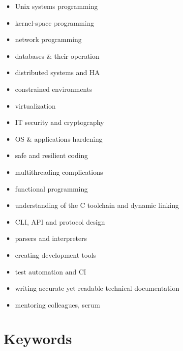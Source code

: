\documentclass[a4paper,12pt]{article}
\newcommand{\compress}{\setlength\itemsep{-\parskip}}
\newenvironment{compressedItemize}{\begin{itemize}\compress}{\end{itemize}}
\begin{document}
\begin{multicols}{3}
\begin{compressedItemize}
\item	Unix systems programming
\item	kernel-space programming
\item	network programming
\item	databases \& their operation
\item	distributed systems and HA
\item	constrained environments
\item	virtualization
\columnbreak
\item	IT security and cryptography
\item	OS \& applications hardening
\item	safe and resilient coding
\item	multithreading complications
\item	functional programming
\item	understanding of the C tool\-chain and dynamic linking
\columnbreak
\item	CLI, API and protocol design
\item	parsers and interpreters
\item	creating development tools
\item	test automation and CI
\item	writing accurate yet readable
	technical documentation
\item	mentoring colleagues, scrum
\end{compressedItemize}
\end{multicols}

\section{Keywords}
\end{document}
